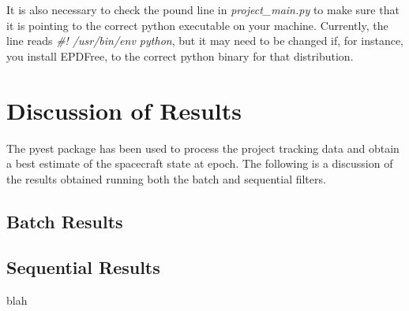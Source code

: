 \documentclass[10pt]{article}
\begin{document}
It is also necessary to check the pound line in \emph{project\_main.py} to make sure that it is pointing to the correct python executable on your machine. Currently, the line reads \emph{\#! /usr/bin/env python}, but it may need to be changed if, for instance, you install EPDFree, to the correct python binary for that distribution.

\section{Discussion of Results}

The pyest package has been used to process the project tracking data and obtain a best estimate of the spacecraft state at epoch. The following is a discussion of the results obtained running both the batch and sequential filters.

\subsection{Batch Results}



\subsection{Sequential Results}

blah
\end{document}
